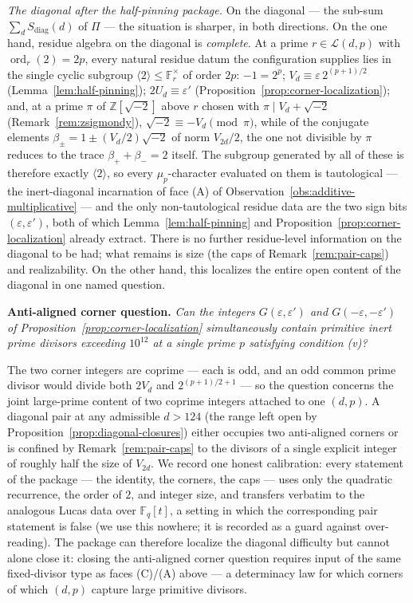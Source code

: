 \documentclass[11pt]{amsart}
\theoremstyle{plain}
\theoremstyle{definition}
\theoremstyle{remark}
\numberwithin{equation}{section}
\newcommand{\ord}{\operatorname{ord}}
\newcommand{\Z}{\mathbb{Z}}
\newcommand{\F}{\mathbb{F}}
\begin{document}
\medskip
\noindent\emph{The diagonal after the half-pinning package.} On the diagonal --- the sub-sum $\sum_d S_{\mathrm{diag}}(d)$ of $\Pi$ --- the situation is sharper, in both directions. On the one hand, residue algebra on the diagonal is \emph{complete}. At a prime $r \in \mathcal{L}(d, p)$ with $\ord_r(2) = 2p$, every natural residue datum the configuration supplies lies in the single cyclic subgroup $\langle 2 \rangle \leq \F_r^\times$ of order $2 p$: $-1 = 2^p$; $V_d \equiv \varepsilon\, 2^{(p+1)/2}$ (Lemma~\ref{lem:half-pinning}); $2 U_d \equiv \varepsilon'$ (Proposition~\ref{prop:corner-localization}); and, at a prime $\pi$ of $\Z[\sqrt{-2}]$ above $r$ chosen with $\pi \mid V_d + \sqrt{-2}$ (Remark~\ref{rem:zsigmondy}), $\sqrt{-2} \equiv -V_d \pmod \pi$, while of the conjugate elements $\beta_{\pm} = 1 \pm (V_d/2)\sqrt{-2}$ of norm $V_{2d}/2$, the one not divisible by $\pi$ reduces to the trace $\beta_+ + \beta_- = 2$ itself. The subgroup generated by all of these is therefore exactly $\langle 2 \rangle$, so every $\mu_p$-character evaluated on them is tautological --- the inert-diagonal incarnation of face (A) of Observation~\ref{obs:additive-multiplicative} --- and the only non-tautological residue data are the two sign bits $(\varepsilon, \varepsilon')$, both of which Lemma~\ref{lem:half-pinning} and Proposition~\ref{prop:corner-localization} already extract. There is no further residue-level information on the diagonal to be had; what remains is size (the caps of Remark~\ref{rem:pair-caps}) and realizability. On the other hand, this localizes the entire open content of the diagonal in one named question.

\medskip
\noindent\textbf{Anti-aligned corner question.} \emph{Can the integers $G(\varepsilon, \varepsilon')$ and $G(-\varepsilon, -\varepsilon')$ of Proposition~\ref{prop:corner-localization} simultaneously contain primitive inert prime divisors exceeding $10^{12}$ at a single prime $p$ satisfying condition (v)?}
\medskip

The two corner integers are coprime --- each is odd, and an odd common prime divisor would divide both $2 V_d$ and $2^{(p+1)/2 + 1}$ --- so the question concerns the joint large-prime content of two coprime integers attached to one $(d, p)$. A diagonal pair at any admissible $d > 124$ (the range left open by Proposition~\ref{prop:diagonal-closures}) either occupies two anti-aligned corners or is confined by Remark~\ref{rem:pair-caps} to the divisors of a single explicit integer of roughly half the size of $V_{2d}$. We record one honest calibration: every statement of the package --- the identity, the corners, the caps --- uses only the quadratic recurrence, the order of $2$, and integer size, and transfers verbatim to the analogous Lucas data over $\F_q[t]$, a setting in which the corresponding pair statement is false (we use this nowhere; it is recorded as a guard against over-reading). The package can therefore localize the diagonal difficulty but cannot alone close it: closing the anti-aligned corner question requires input of the same fixed-divisor type as faces (C)/(A) above --- a determinacy law for which corners of which $(d, p)$ capture large primitive divisors.
\end{document}
